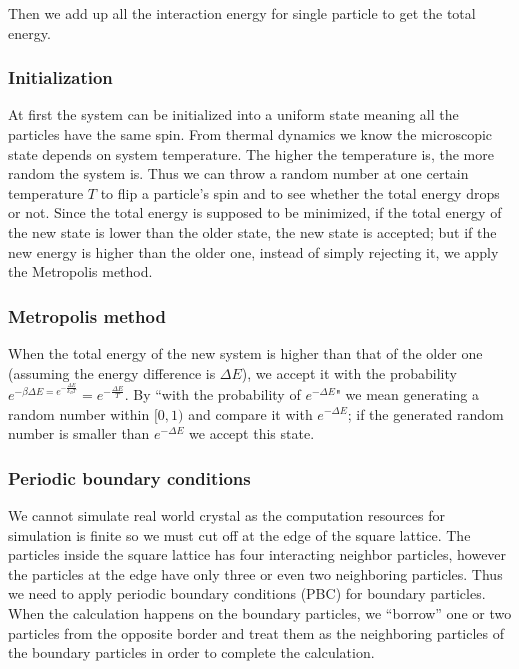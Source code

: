 \documentclass[11pt, a4paper]{article}
\begin{document}
Then we add up all the interaction energy for single particle to get the total energy.

\subsubsection{Initialization}

At first the system can be initialized into a uniform state meaning all the particles have the same spin. From thermal dynamics we know the microscopic state depends on system temperature. The higher the temperature is, the more random the system is. Thus we can throw a random number at one certain temperature $T$ to flip a particle's spin and to see whether the total energy drops or not. Since the total energy is supposed to be minimized, if the total energy of the new state is lower than the older state, the new state is accepted; but if the new energy is higher than the older one, instead of simply rejecting it, we apply the Metropolis method\cite{metropolis}.

\subsubsection{Metropolis method}
When the total energy of the new system is higher than that of the older one (assuming the energy difference is $\Delta E$), we accept it with the probability $e^{-\beta\Delta E = e^{-\frac{\Delta E}{k_BT}}} = e^{-\frac{\Delta E}{T}}$. By ``with the probability of $e^{-\Delta E}$" we mean generating a random number within $[0,1)$ and compare it with $e^{-\Delta E}$; if the generated random number is smaller than $e^{-\Delta E}$ we accept this state.

\subsubsection{Periodic boundary conditions}
We cannot simulate real world crystal as the computation resources for simulation is finite so we must cut off at the edge of the square lattice. The particles inside the square lattice has four interacting neighbor particles, however the particles at the edge have only three or even two neighboring particles. Thus we need to apply periodic boundary conditions (PBC) for boundary particles. When the calculation happens on the boundary particles, we ``borrow'' one or two particles from the opposite border and treat them as the neighboring particles of the boundary particles in order to complete the calculation.
\end{document}
